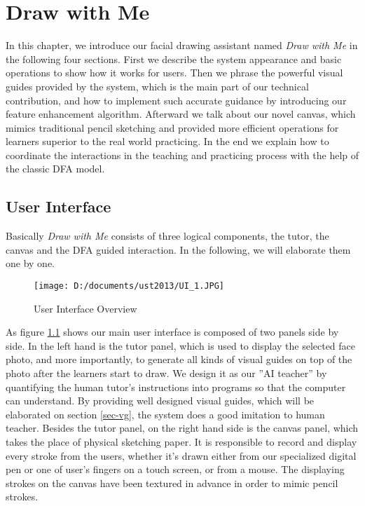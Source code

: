 \chapter{Draw with Me} \label{sec-mainwork}

		In this chapter, we introduce our facial drawing assistant named \textit{Draw with Me} in the following four sections. First we describe the system appearance and basic operations to show how it works for users. Then we phrase the powerful visual guides provided by the system, which is the main part of our technical contribution, and how to implement such accurate guidance by introducing our feature enhancement algorithm. Afterward we talk about our novel canvas, which mimics traditional pencil sketching and provided more efficient operations for learners superior to the real world practicing. In the end we explain how to coordinate the interactions in the teaching and practicing process with the help of the classic DFA model.

\section{User Interface}

		Basically \textit{Draw with Me} consists of three logical components, the tutor, the canvas and the DFA guided interaction. In the following, we will elaborate them one by one. 
	
		\begin{figure}[htbp]
			\centering
				\texttt{[image: D:/documents/ust2013/UI\_1.JPG]}
			\caption{User Interface Overview}
			\label{fig:UI}
		\end{figure}
		
		
		As figure \ref{fig:UI} shows our main user interface is composed of two panels side by side. In the left hand is the tutor panel, which is used to display the selected face photo, and more importantly, to generate all kinds of visual guides on top of the photo after the learners start to draw. We design it as our ''AI teacher'' by quantifying the human tutor's instructions into programs so that the computer can understand. By providing well designed visual guides, which will be elaborated on section \ref{sec-vg}, the system does a good imitation to human teacher. Besides the tutor panel, on the right hand side is the canvas panel, which takes the place of physical sketching paper. It is responsible to record and display every stroke from the users, whether it's drawn either from our specialized digital pen or one of user's fingers on a touch screen, or from a mouse. The displaying strokes on the canvas have been textured in advance in order to mimic pencil strokes. 
		
